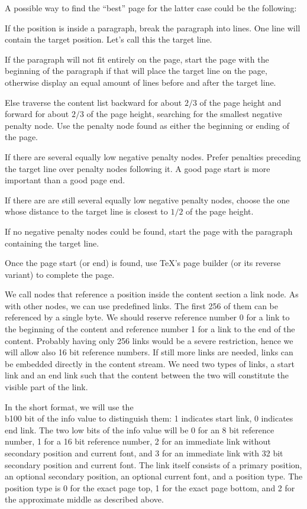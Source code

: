A possible way to find the ``best'' page for the latter case could be the following:
\itemize
\item If the position is inside a paragraph, break the paragraph into lines. One line will contain
the target position. Let's call this the target line.
\item If the paragraph will not fit entirely on the page, start the page with the beginning of the
paragraph if that will place the target line on the page, otherwise
display an equal amount of lines before and after the target line.
\item Else traverse the content list backward for about $2/3$ of the page height and forward for about $2/3$
of the page height, searching for the smallest negative penalty node.
Use the  penalty node found as either the beginning
or ending of the page.
\item If there are several equally low negative penalty nodes. Prefer penalties preceding the target line
over penalty nodes following it. A good page start is more important than a good page end.
\item If there are are still several equally low negative penalty nodes, choose the one whose distance
to the target line is closest to $1/2$ of the page height.
\item If no negative penalty nodes could be found, start the page with the paragraph containing the target line.
\item Once the page start (or end) is found, use \TeX's page builder (or its reverse variant) to complete the page.
\enditemize

We call nodes that reference a position inside the content section a
link node.  As with other nodes, we can use predefined links. The
first 256 of them can be referenced by a single byte.  We should
reserve reference number 0 for a link to the beginning of the content
and reference number 1 for a link to the end of the content.  Probably
having only 256 links would be a severe restriction, hence we will
allow also 16 bit reference numbers.  If still more links are needed,
links can be embedded directly in the content stream.  We need two
types of links, a start link and an end link such that the content
between the two will constitute the visible part of the link.


In the short format, we will use the \\{b100} bit of the info value to
distinguish them: 1 indicates start link, 0 indicates end link. The
two low bits of the info value will be 0 for an 8 bit reference
number, 1 for a 16 bit reference number,  2 for an immediate
link without secondary position and current font, and  3 for an immediate
link with 32 bit secondary position and current font.
The link itself consists of a primary position, an optional
secondary position, an optional current font, and a position type. The
position type is 0 for the exact page top, 1 for the exact page
bottom, and 2 for the approximate middle as described above.


